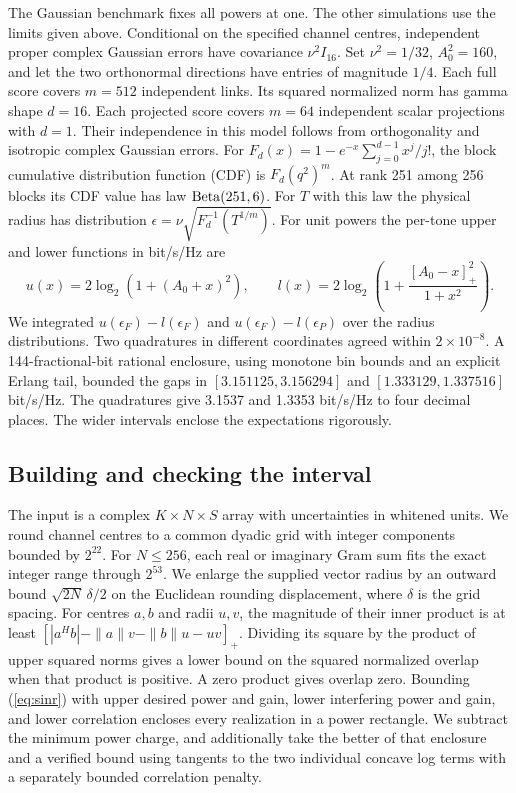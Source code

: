 \documentclass[lineno,pdflatex,sn-nature]{sn-jnl}
\begin{document}
The Gaussian benchmark fixes all powers at one. The other simulations use the limits given above. Conditional on the specified channel centres, independent proper complex Gaussian errors have covariance \(\nu^2 I_{16}\). Set \(\nu^2=1/32\), \(A_0^2=160\), and let the two orthonormal directions have entries of magnitude \(1/4\). Each full score covers \(m=512\) independent links. Its squared normalized norm has gamma shape \(d=16\). Each projected score covers \(m=64\) independent scalar projections with \(d=1\). Their independence in this model follows from orthogonality and isotropic complex Gaussian errors. For \(F_d(x)=1-e^{-x}\sum_{j=0}^{d-1}x^j/j!\), the block cumulative distribution function (CDF) is \(F_d(q^2)^m\). At rank 251 among 256 blocks its CDF value has law \({\rm Beta}(251,6)\). For \(T\) with this law the physical radius has distribution \(\epsilon=\nu\sqrt{F_d^{-1}(T^{1/m})}\). For unit powers the per-tone upper and lower functions in bit/s/Hz are
\[
 u(x)=2\log_2(1+(A_0+x)^2),\qquad
 l(x)=2\log_2\!\left(1+\frac{\left[A_0-x\right]_{+}^2}{1+x^2}\right).
\]
We integrated \(u(\epsilon_F)-l(\epsilon_F)\) and \(u(\epsilon_F)-l(\epsilon_P)\) over the radius distributions. Two quadratures in different coordinates agreed within \(2\times10^{-8}\). A 144-fractional-bit rational enclosure, using monotone bin bounds and an explicit Erlang tail, bounded the gaps in \([3.151125,3.156294]\) and \([1.333129,1.337516]\) bit/s/Hz. The quadratures give 3.1537 and 1.3353 bit/s/Hz to four decimal places. The wider intervals enclose the expectations rigorously.

\subsection*{Building and checking the interval}
The input is a complex \(K\times N\times S\) array with uncertainties in whitened units. We round channel centres to a common dyadic grid with integer components bounded by \(2^{22}\). For \(N\leq256\), each real or imaginary Gram sum fits the exact integer range through \(2^{53}\). We enlarge the supplied vector radius by an outward bound \(\sqrt{2N}\,\delta/2\) on the Euclidean rounding displacement, where \(\delta\) is the grid spacing. For centres \(a,b\) and radii \(u,v\), the magnitude of their inner product is at least \(\left[|a^Hb|-\|a\|v-\|b\|u-uv\right]_{+}\). Dividing its square by the product of upper squared norms gives a lower bound on the squared normalized overlap when that product is positive. A zero product gives overlap zero. Bounding (\ref{eq:sinr}) with upper desired power and gain, lower interfering power and gain, and lower correlation encloses every realization in a power rectangle. We subtract the minimum power charge, and additionally take the better of that enclosure and a verified bound using tangents to the two individual concave log terms with a separately bounded correlation penalty.
\end{document}
